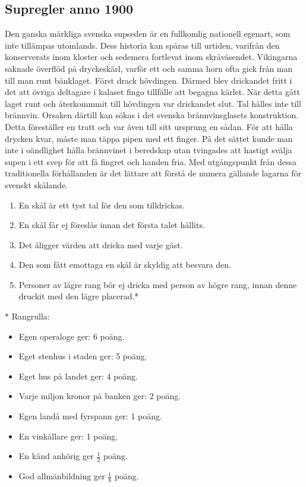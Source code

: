 \newpage
\begin{flushleft}
\section{Supregler anno 1900}
\end{flushleft}
{\large
Den ganska märkliga svenska supseden är en fullkomlig nationell egenart, som inte tillämpas utomlands.
Dess historia kan spåras till urtiden, varifrån den konserverats inom kloster och sedemera fortlevat inom skråväsendet.
Vikingarna saknade överflöd på dryckeskärl, varför ett och samma horn ofta gick från man till man runt bänklaget.
Först drack hövdingen.
Därmed blev drickandet fritt i det att övriga deltagare i kalaset fingo tillfälle att begagna kärlet.
När detta gått laget runt och återkommmit till hövdingen var drickandet slut.
Tal hålles inte till brännvin.
Orsaken därtill kan sökas i det svenska brännvinsglasets konstruktion.
Detta föreställer en tratt och var även till sitt ursprung en sådan.
För att hålla drycken kvar, måste man täppa pipen med ett finger.
På det sättet kunde man inte i oändlighet hålla brännvinet i beredskap
utan tvingades att hastigt svälja supen i ett svep för att få fingret och handen fria.
Med utgångspunkt från dessa traditionella förhållanden
är det lättare att förstå de numera gällande lagarna för svenskt skålande.
\vspace{.8em}
\begin{enumerate}
\item En skål är ett tyst tal för den som tilldrickas.
\item En skål får ej föreslås innan det första talet hållits.
\item Det åligger värden att dricka med varje gäst.
\item Den som fått emottaga en skål är skyldig att besvara den.
\item Personer av lägre rang bör ej dricka med person av högre rang,
innan denne druckit med den lägre placerad.*
\end{enumerate}
\newpage

* Rangrulla:
\begin{itemize}
    \item Egen operaloge ger: 6 poäng.
    \item Eget stenhus i staden ger: 5 poäng.
    \item Eget hus på landet ger: 4 poäng.
    \item Varje miljon kronor på banken ger: 2 poäng.
    \item Egen landå med fyrspann ger: 1 poäng.
    \item En vinkällare ger: 1 poäng.
    \item En känd anhörig ger $\frac{1}{2}$ poäng.
    \item God allmänbildning ger $\frac{1}{8}$ poäng.
\end{itemize}
}

